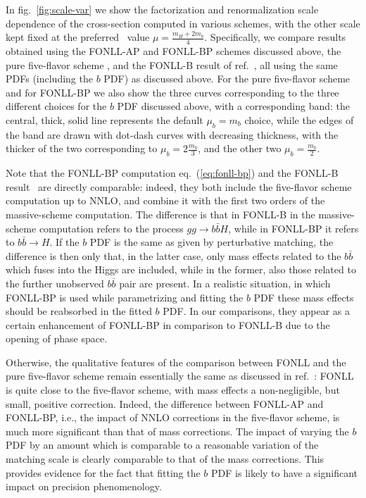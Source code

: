 In fig.~\ref{fig:scale-var} we show the factorization and
renormalization scale dependence of the cross-section computed in
various schemes, with the other scale kept fixed at the
preferred~\cite{Forte:2015hba,Forte:2016sja} value
$\mu=\frac{m_H+2m_b}{4}$.
Specifically, we compare results obtained using the FONLL-AP and
FONLL-BP schemes discussed above, the pure five-flavor scheme , and
the FONLL-B result of ref.~\cite{Forte:2016sja}, all using the same
PDFs (including the $b$ PDF) as discussed above. For the pure
five-flavor scheme and for FONLL-BP we also show
the three curves corresponding to the three different choices for the
$b$ PDF discussed above, with a corresponding band:
the central, thick, solid line represents the default $\mu_b=m_b$
choice, while the edges of the band are drawn with dot-dash curves
with decreasing thickness, with the thicker of the two corresponding
to $\mu_b=2\frac{m_b}{3}$, and the other two $\mu_b=\frac{m_b}{2}$.

Note that the
FONLL-BP computation eq.~(\ref{eq:fonll-bp}) and the FONLL-B
result~\cite{Forte:2016sja} are directly comparable: indeed, they both
include the five-flavor scheme computation up to NNLO, and combine it
with the first
two orders of the massive-scheme computation. The difference is that
in FONLL-B in the massive-scheme computation refers to the process
$gg\to b\bar b H$, while in FONLL-BP it refers to  $b\bar b \to H$. If
the $b$ PDF is the same as given by perturbative matching, the
difference is then only that, in the latter case, only mass effects
related to the $b\bar b$ which fuses into the Higgs are included,
while in the former, also those related to the further unobserved
$b\bar b$ pair are present. In a realistic situation, in which FONLL-BP is used
while parametrizing and fitting the $b$ PDF these mass effects should
be reabsorbed in the fitted $b$ PDF. In our comparisons, they 
appear as a certain enhancement of FONLL-BP in comparison to FONLL-B
due to the opening of phase space. 


Otherwise, the qualitative features of the comparison between FONLL
and the pure five-flavor scheme remain essentially the same as discussed
in ref.~\cite{Forte:2016sja}: FONLL is quite close to the
five-flavor scheme, with mass effects a non-negligible, but small,
positive correction. Indeed, the difference between
FONLL-AP and FONLL-BP, i.e., the impact of NNLO corrections in the
five-flavor scheme, is much more significant than that of mass corrections.
The impact of varying the $b$ PDF by
an amount which is comparable to a reasonable variation of the
matching scale is clearly comparable to that of the mass
corrections. This provides evidence for the fact that fitting the $b$
PDF is likely to have a significant impact on precision phenomenology.


